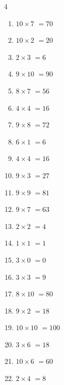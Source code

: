 \begin{multicols}{4}
\begin{enumerate}
  \item $10\times 7$
        $=70$

  \item $10\times 2$
        $=20$

  \item $2\times 3$
        $=6$

  \item $9\times 10$
        $=90$

  \item $8\times 7$
        $=56$

  \item $4\times 4$
        $=16$

  \item $9\times 8$
        $=72$

  \item $6\times 1$
        $=6$

  \item $4\times 4$
        $=16$

  \item $9\times 3$
        $=27$

\columnbreak %

\resetques

  \item $9\times 9$
        $=81$

  \item $9\times 7$
        $=63$

  \item $2\times 2$
        $=4$

  \item $1\times 1$
        $=1$

  \item $3\times 0$
        $=0$

  \item $3\times 3$
        $=9$

  \item $8\times 10$
        $=80$

  \item $9\times 2$
        $=18$

  \item $10\times 10$
        $=100$

  \item $3\times 6$
        $=18$

  \item $10\times 6$
        $=60$

  \item $2\times 4$
        $=8$


\end{enumerate}
\end{multicols}
